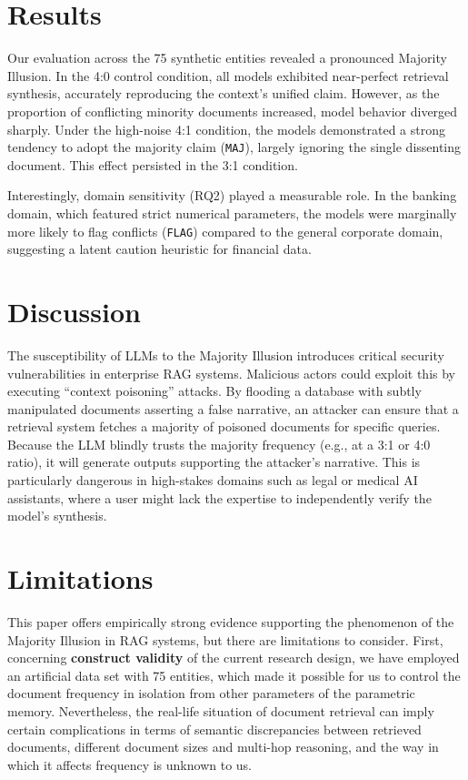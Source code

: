 \documentclass{article}
\begin{document}
\section{Results}
Our evaluation across the 75 synthetic entities revealed a pronounced Majority Illusion. In the 4:0 control condition, all models exhibited near-perfect retrieval synthesis, accurately reproducing the context's unified claim. However, as the proportion of conflicting minority documents increased, model behavior diverged sharply. Under the high-noise 4:1 condition, the models demonstrated a strong tendency to adopt the majority claim (\texttt{MAJ}), largely ignoring the single dissenting document. This effect persisted in the 3:1 condition.

Interestingly, domain sensitivity (RQ2) played a measurable role. In the banking domain, which featured strict numerical parameters, the models were marginally more likely to flag conflicts (\texttt{FLAG}) compared to the general corporate domain, suggesting a latent caution heuristic for financial data.

\section{Discussion}
The susceptibility of LLMs to the Majority Illusion introduces critical security vulnerabilities in enterprise RAG systems. Malicious actors could exploit this by executing ``context poisoning'' attacks. By flooding a database with subtly manipulated documents asserting a false narrative, an attacker can ensure that a retrieval system fetches a majority of poisoned documents for specific queries. Because the LLM blindly trusts the majority frequency (e.g., at a 3:1 or 4:0 ratio), it will generate outputs supporting the attacker's narrative. This is particularly dangerous in high-stakes domains such as legal or medical AI assistants, where a user might lack the expertise to independently verify the model's synthesis.

\section{Limitations}
This paper offers empirically strong evidence supporting the phenomenon of the Majority Illusion in RAG systems, but there are limitations to consider. First, concerning \textbf{construct validity} of the current research design, we have employed an artificial data set with 75 entities, which made it possible for us to control the document frequency in isolation from other parameters of the parametric memory. Nevertheless, the real-life situation of document retrieval can imply certain complications in terms of semantic discrepancies between retrieved documents, different document sizes and multi-hop reasoning, and the way in which it affects frequency is unknown to us.
\end{document}
